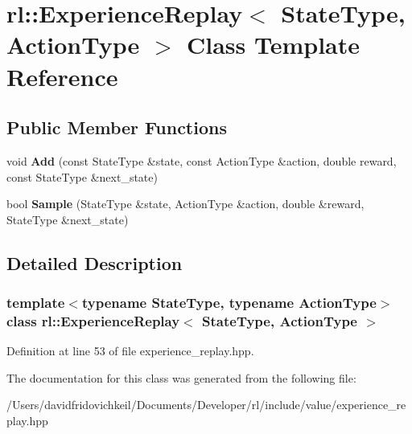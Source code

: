 \hypertarget{classrl_1_1_experience_replay}{}\section{rl\+:\+:Experience\+Replay$<$ State\+Type, Action\+Type $>$ Class Template Reference}
\label{classrl_1_1_experience_replay}
\subsection*{Public Member Functions}
\begin{DoxyCompactItemize}
\item 
\hypertarget{classrl_1_1_experience_replay_af3a24418dda62522856af859215cb1c7}{}\label{classrl_1_1_experience_replay_af3a24418dda62522856af859215cb1c7} 
void {\bfseries Add} (const State\+Type \&state, const Action\+Type \&action, double reward, const State\+Type \&next\+\_\+state)
\item 
\hypertarget{classrl_1_1_experience_replay_a051700be7bdd8ec4199436d2aeda8bee}{}\label{classrl_1_1_experience_replay_a051700be7bdd8ec4199436d2aeda8bee} 
bool {\bfseries Sample} (State\+Type \&state, Action\+Type \&action, double \&reward, State\+Type \&next\+\_\+state)
\end{DoxyCompactItemize}


\subsection{Detailed Description}
\subsubsection*{template$<$typename State\+Type, typename Action\+Type$>$\newline
class rl\+::\+Experience\+Replay$<$ State\+Type, Action\+Type $>$}



Definition at line 53 of file experience\+\_\+replay.\+hpp.



The documentation for this class was generated from the following file\+:\begin{DoxyCompactItemize}
\item 
/\+Users/davidfridovichkeil/\+Documents/\+Developer/rl/include/value/experience\+\_\+replay.\+hpp\end{DoxyCompactItemize}

